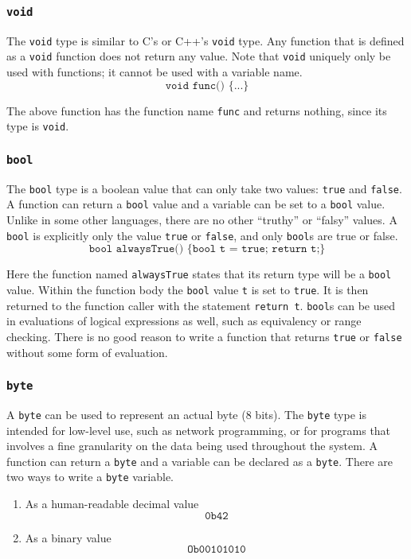 \documentclass{article}
\newcommand{\code}{\texttt}
\begin{document}
\subsubsection{\code{void}}
The \code{void} type is similar to C's or C++'s \code{void} type. Any function that is defined as a \code{void} function does not return any value. Note that \code{void} uniquely only be used with functions; it cannot be used with a variable name.
\[\code{void func() \{...\}} \]

The above function has the function name \code{func} and returns nothing, since its type is \code{void}. 

\subsubsection{\code{bool}}
The \code{bool} type is a boolean value that can only take two values: \code{true} and \code{false}. A function can return a \code{bool} value and a variable can be set to a \code{bool} value. Unlike in some other languages, there are no other ``truthy'' or ``falsy'' values. A \code{bool} is explicitly only the value \code{true} or \code{false}, and only \code{bool}s are true or false.
\[\code{bool alwaysTrue() \{ bool t = true; return t;\}} \]

Here the function named \code{alwaysTrue} states that its return type will be a \code{bool} value. Within the function body the \code{bool} value \code{t} is set to \code{true}. It is then returned to the function caller with the statement \code{return t}. \code{bool}s can be used in evaluations of logical expressions as well, such as equivalency or range checking. There is no good reason to write a function that returns \code{true} or \code{false} without some form of evaluation. 

\subsubsection{\code{byte}}
A \code{byte} can be used to represent an actual byte (8 bits). The \code{byte} type is intended for low-level use, such as network programming, or for programs that involves a fine granularity on the data being used throughout the system. A function can return a \code{byte} and a variable can be declared as a \code{byte}. There are two ways to write a \code{byte} variable.
\begin{enumerate}
\item As a human-readable decimal value
\[ \code{0b42} \]
\item As a binary value
\[ \code{Ob00101010} \]
\end{enumerate}
\end{document}
